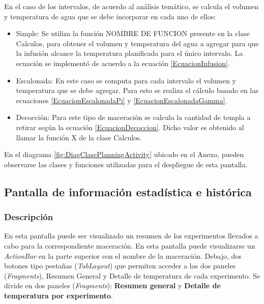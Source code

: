             \par En el caso de los intervalos, de acuerdo al análisis temático, se calcula el volumen y temperatura de agua que se debe incorporar en cada uno de ellos:
            \begin{itemize}
                \item Simple: Se utiliza la función NOMBRE DE FUNCION presente en la clase Calculos, para obtener el volumen y temperatura del agua a agregar para que la infusión alcance la temperatura planificada para el único intervalo. La ecuación se implementó de acuerdo a la ecuación \ref{EcuacionInfusion}.
                
                \item Escalonada: En este caso se computa para cada intervalo el volumen y temperatura que se debe agregar. Para esto se realiza el cálculo basado en las ecuaciones \ref{EcuacionEscalonadaPi} y \ref{EcuacionEscalonadaGamma}.
                
                \item Decocción: Para este tipo de maceración se calcula la cantidad de templa a retirar según la ecuación \ref{EcuacionDecoccion}. Dicho valor es obtenido al llamar la función X de la clase Calculos.
            \end{itemize}
            
            \par En el diagrama \ref{fig:DiagClasePlanningActivity} ubicado en el Anexo, pueden observarse las clases y funciones utilizadas para el despliegue de esta pantalla.
        
            
        \subsection{Pantalla de información estadística e histórica}
        \label{DescripPantallaEstadística}
            \subsubsection{Descripción}
            En esta pantalla puede ser visualizado un resumen de los experimentos llevados a cabo para la correspondiente maceración.
            En esta pantalla puede visualizarse un \textit{ActionBar} en la parte superior con el nombre de la maceración. Debajo, dos botones tipo pestañas (\textit{TabLayout}) que permiten acceder a los dos paneles (\textit{Fragments}), Resumen General y Detalle de temperatura de cada experimento. 
            Se divide en dos paneles (\textit{Fragments}): \textbf{Resumen general} y \textbf{Detalle de temperatura por experimento}.
            
